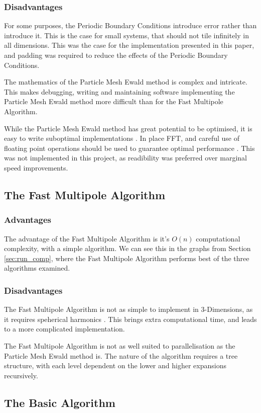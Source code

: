 \documentclass[pdftex,twoside,a4paper]{report}
\newcommand{\pmem}{Particle Mesh Ewald method}
\newcommand{\fma}{Fast Multipole Algorithm}
\begin{document}
\subsubsection{Disadvantages}
For some purposes, the Periodic Boundary Conditions introduce error rather than introduce it. This is the case for small systems, that should not tile infinitely in all dimensions. This was the case for the implementation presented in this paper, and padding was required to reduce the effects of the Periodic Boundary Conditions.

The mathematics of the \pmem{} is complex and intricate. This makes debugging, writing and maintaining software implementing the \pmem{} more difficult than for the \fma{}. 

While the \pmem{} has great potential to be optimised, it is easy to write suboptimal implementations \cite{toukmaji:73}. In place FFT, and careful use of floating point operations should be used to guarantee optimal performance \cite{lee05}. This was not implemented in this project, as readibility was preferred over marginal speed improvements.

\subsection{The \fma{}}
\subsubsection{Advantages}
The advantage of the \fma{} is it's $O(n)$ computational complexity, with a simple algorithm. We can see this in the graphs from Section \ref{sec:run_comp}, where the \fma{} performs best of the three algorithms examined.

\subsubsection{Disadvantages}
The \fma{} is not as simple to implement in 3-Dimensions, as it requires speherical harmonics \cite{spherical}. This brings extra computational time, and leads to a more complicated implementation.

The \fma{} is not as well suited to parallelisation as the \pmem{} is. The nature of the algorithm requires a tree structure, with each level dependent on the lower and higher expansions recursively.

\subsection{The Basic Algorithm}
\end{document}
